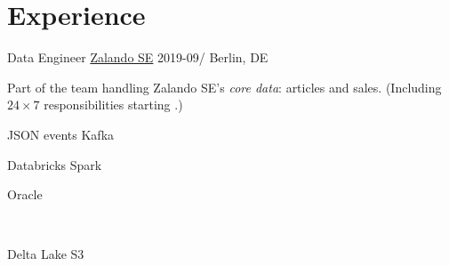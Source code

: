 \documentclass[%
version=last,%
fontsize=11pt,%
paper=A4,%
headinclude=false,%
footinclude=false,%
headlines=0,%
footlines=0,%
areasetadvanced,%
toc=bibnumbered,%
]{scrartcl}%
\begin{document}
\begin{minipage}[t]{0.575\textwidth}
  \section{Experience}%
  \label{sec:experience}

  \WorkEntry%
  {Data Engineer}%
  {\href{https://corporate.zalando.com/en}{Zalando SE}}%
  {2019-09/}%
  {Berlin, DE}%
  {%
    Part of the team handling Zalando SE’s \emph{core data}: articles and
    sales. (Including \(24 \times 7\) responsibilities starting
    .)%
    \vspace*{20pt}
    \newline
    \begingroup%
    \begin{minipage}{.2\linewidth}
      \begin{tcolorbox}[title=Nakadi, remember as=Kafka]
        JSON events%
        \tcblower%
        Kafka
      \end{tcolorbox}
    \end{minipage}%
    \hfill%
    \begin{minipage}{.2\linewidth}
      \begin{tcolorbox}[title=AWS, remember as=Spark]
        Databricks%
        \tcblower%
        Spark
      \end{tcolorbox}%
    \end{minipage}%
    \hfill%
    \begin{minipage}{.2\linewidth}
      \begin{tcolorbox}[remember as=Oracle]
        Oracle
      \end{tcolorbox}%
      \\%
      \begin{tcolorbox}[remember as=S3]
        Delta Lake%
        \tcblower%
        S3
      \end{tcolorbox}
    \end{minipage}%
    \hfill%
}
\end{minipage}
\end{document}
